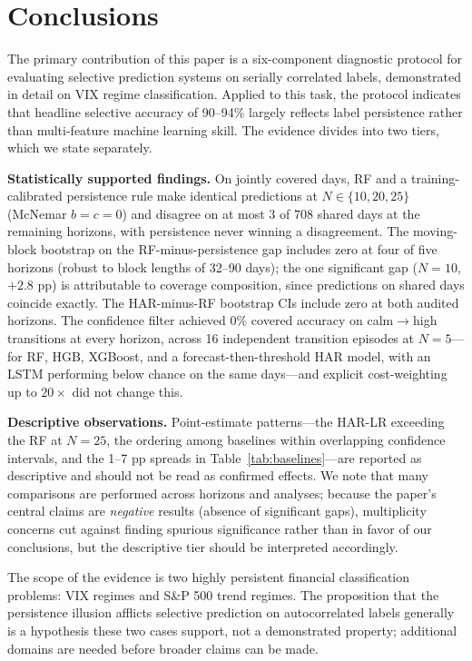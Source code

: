 \documentclass[12pt]{article}
\begin{document}
\section{Conclusions}
\label{sec:conclusion}

The primary contribution of this paper is a six-component diagnostic protocol for evaluating
selective prediction systems on serially correlated labels, demonstrated in detail on VIX
regime classification. Applied to this task, the protocol indicates that headline selective
accuracy of 90--94\% largely reflects label persistence rather than multi-feature machine
learning skill. The evidence divides into two tiers, which we state separately.

\textbf{Statistically supported findings.} On jointly covered days, RF and a
training-calibrated persistence rule make identical predictions at $N \in \{10, 20, 25\}$
(McNemar $b = c = 0$) and disagree on at most 3 of 708 shared days at the remaining horizons,
with persistence never winning a disagreement. The moving-block bootstrap on the
RF-minus-persistence gap includes zero at four of five horizons (robust to block lengths of
32--90 days); the one significant gap ($N = 10$, $+2.8$ pp) is attributable to coverage
composition, since predictions on shared days coincide exactly. The HAR-minus-RF bootstrap CIs
include zero at both audited horizons. The confidence filter achieved 0\% covered accuracy on
calm$\to$high transitions at every horizon, across 16 independent transition episodes at
$N = 5$---for RF, HGB, XGBoost, and a forecast-then-threshold HAR model, with an LSTM
performing below chance on the same days---and explicit cost-weighting up to $20{\times}$
did not change this.

\textbf{Descriptive observations.} Point-estimate patterns---the HAR-LR exceeding the RF at
$N = 25$, the ordering among baselines within overlapping confidence intervals, and the
1--7 pp spreads in Table~\ref{tab:baselines}---are reported as descriptive and should not be
read as confirmed effects. We note that many comparisons are performed across horizons and
analyses; because the paper's central claims are \emph{negative} results (absence of
significant gaps), multiplicity concerns cut against finding spurious significance rather than
in favor of our conclusions, but the descriptive tier should be interpreted accordingly.

The scope of the evidence is two highly persistent financial classification problems: VIX
regimes and S\&P 500 trend regimes. The proposition that the persistence illusion afflicts
selective prediction on autocorrelated labels generally is a hypothesis these two cases
support, not a demonstrated property; additional domains are needed before broader claims can
be made.
\end{document}
